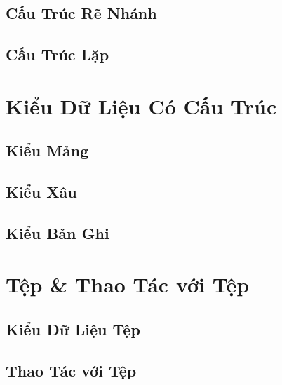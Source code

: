 \documentclass[oneside]{book}
\numberwithin{equation}{section}
\begin{document}
\section{Cấu Trúc Rẽ Nhánh}


\section{Cấu Trúc Lặp}


\chapter{Kiểu Dữ Liệu Có Cấu Trúc}

\section{Kiểu Mảng}


\section{Kiểu Xâu}


\section{Kiểu Bản Ghi}


\chapter{Tệp \& Thao Tác với Tệp}

\section{Kiểu Dữ Liệu Tệp}


\section{Thao Tác với Tệp}
\end{document}
